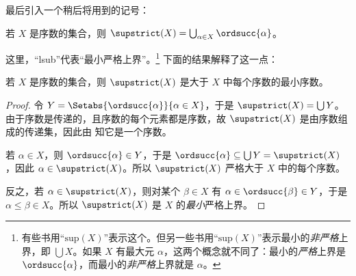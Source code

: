 \documentclass[../../../include/open-logic-section]{subfiles}
\begin{document}
\noindent
最后引入一个稍后将用到的记号：

\begin{defn}
若 $X$ 是序数的集合，则 $\supstrict(X) = \bigcup_{\alpha
\in X} \ordsucc{\alpha}$。
\end{defn}

\noindent
这里，“lsub”代表“最小严格上界”。\footnote{有些书用“$\text{sup}(X)$”表示这个。但另一些书用“$\text{sup}(X)$”表示最小的\emph{非严格}上界，即 $\bigcup X$。如果 $X$ 有最大元 $\alpha$，这两个概念就不同了：最小的\emph{严格}上界是 $\ordsucc{\alpha}$，而最小的\emph{非严格}上界就是 $\alpha$。} 下面的结果解释了这一点：

\begin{prop}
若 $X$ 是序数的集合，则 $\supstrict(X)$ 是大于 $X$ 中每个序数的最小序数。
\end{prop}

\begin{proof}
令 $Y = \Setabs{\ordsucc{\alpha}}{\alpha \in X}$，于是 $\supstrict(X) = \bigcup Y$。由于序数是传递的，且序数的每个元素都是序数，故 $\supstrict(X)$ 是由序数组成的传递集，因此由  知它是一个序数。

若 $\alpha \in X$，则 $\ordsucc{\alpha} \in Y$，于是 $\ordsucc{\alpha}
\subseteq \bigcup Y = \supstrict(X)$，因此 $\alpha \in \supstrict(X)$。所以 $\supstrict(X)$ 严格大于 $X$ 中的每个序数。

反之，若 $\alpha \in \supstrict(X)$，则对某个 $\beta \in X$ 有 $\alpha \in \ordsucc{\beta} \in Y$，于是 $\alpha \leq \beta \in X$。所以 $\supstrict(X)$ 是 $X$ 的\emph{最小}严格上界。
\end{proof}
\end{document}
